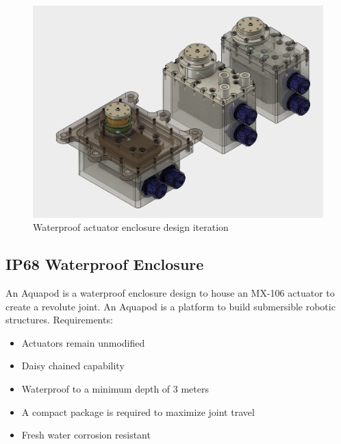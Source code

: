 \begin{figure}[h]
\centering
\includegraphics[width=1.0\columnwidth]{./img/aquaPod-evolution.png}
\caption{Waterproof actuator enclosure design iteration }
\label{fig:pod evolution}
\end{figure}


\subsection{IP68 Waterproof Enclosure}
An Aquapod is a waterproof enclosure design to house an MX-106 actuator to create a revolute joint. An Aquapod is a platform to build submersible robotic structures.
Requirements: 
\begin{itemize}
    \item Actuators remain unmodified 
    
    \item Daisy chained capability

    \item Waterproof to a minimum depth of 3 meters

    \item A compact package is required to maximize joint travel

    \item Fresh water corrosion resistant
    
\end{itemize}


